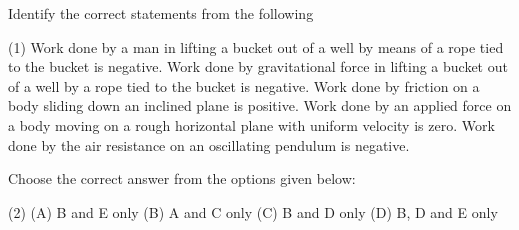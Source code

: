 \item Identify the correct statements from the following 
    \begin{tasks}(1)
        \task Work done by a man in lifting a bucket out of a well by means of a rope tied to the bucket is negative.
        \task Work done by gravitational force in lifting a bucket out of a well by a rope tied to the bucket is negative.
        \task Work done by friction on a body sliding down an inclined plane is positive.
        \task Work done by an applied force on a body moving on a rough horizontal plane with uniform velocity is zero.
        \task Work done by the air resistance on an oscillating pendulum is negative.
    \end{tasks}
Choose the correct answer from the options given below:
    \begin{tasks}(2)
        \task(A) B and E only
        \task(B) A and C only
        \task(C) B and D only
        \task(D) B, D and E only
    \end{tasks}